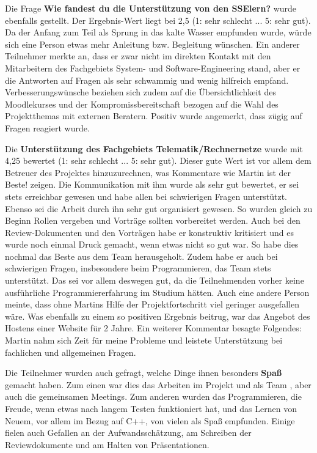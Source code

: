 \documentclass[../review_3.tex]{subfiles}
\begin{document}
Die Frage \glqq \textbf{Wie fandest du die Unterstützung von den SSElern?}\grqq{} wurde ebenfalls gestellt. Der Ergebnis-Wert liegt bei 2,5 (1: sehr schlecht ... 5: sehr gut). Da der Anfang zum Teil als Sprung in das kalte Wasser empfunden wurde, würde sich eine Person etwas mehr Anleitung bzw. Begleitung wünschen. Ein anderer Teilnehmer merkte an, dass er zwar nicht im direkten Kontakt mit den Mitarbeitern des Fachgebiets System- und Software-Engineering stand, aber er die Antworten auf Fragen als sehr schwammig und wenig hilfreich empfand.  Verbesserungswünsche beziehen sich zudem auf die Übersichtlichkeit des Moodlekurses und der Kompromissbereitschaft bezogen auf die Wahl des Projektthemas mit externen Beratern. Positiv wurde angemerkt, dass zügig auf Fragen reagiert wurde.

Die \textbf{Unterstützung des Fachgebiets Telematik/Rechnernetze} wurde mit 4,25 bewertet (1: sehr schlecht ... 5: sehr gut). Dieser gute Wert ist vor allem dem Betreuer des Projektes hinzuzurechnen, was Kommentare wie \glqq Martin ist der Beste!\grqq{} zeigen. Die Kommunikation mit ihm wurde als sehr gut bewertet, er sei stets erreichbar gewesen und habe allen bei schwierigen Fragen unterstützt. Ebenso sei die Arbeit durch ihn sehr gut organisiert gewesen. So wurden gleich zu Beginn Rollen vergeben und Vorträge sollten vorbereitet werden. Auch bei den Review-Dokumenten und den Vorträgen habe er konstruktiv kritisiert und es wurde noch einmal Druck gemacht, wenn etwas nicht so gut war. So habe dies nochmal das Beste aus dem Team herausgeholt. Zudem habe er auch bei schwierigen Fragen, insbesondere beim Programmieren, das Team stets unterstützt. Das sei vor allem deswegen gut, da die Teilnehmenden vorher keine ausführliche Programmiererfahrung im Studium hätten. Auch eine andere Person meinte, dass ohne Martins Hilfe der Projektfortschritt viel geringer ausgefallen wäre. Was ebenfalls zu einem so positiven Ergebnis beitrug, war das Angebot des Hostens einer Website für 2 Jahre. Ein weiterer Kommentar besagte Folgendes: \glqq Martin nahm sich Zeit für meine Probleme und leistete Unterstützung bei fachlichen und allgemeinen Fragen.\grqq{}

Die Teilnehmer wurden auch gefragt, welche Dinge ihnen besonders \textbf{Spaß} gemacht haben.
Zum einen war dies das Arbeiten im Projekt und als Team , aber auch die gemeinsamen Meetings. Zum anderen wurden das Programmieren, die Freude, wenn etwas nach langem Testen funktioniert hat, und das Lernen von Neuem, vor allem im Bezug auf C++, von vielen als Spaß empfunden. Einige fielen auch Gefallen an der Aufwandsschätzung, am Schreiben der Reviewdokumente und am Halten von Präsentationen.
\end{document}
